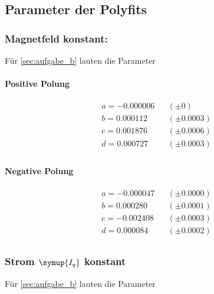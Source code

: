 

\subsection{Parameter der Polyfits}
\label{sec:messwert}


\subsubsection{Magnetfeld konstant:} %
Für \ref{sec:aufgabe_b} lauten die Parameter

\vspace{1cm}
\begin{minipage}{0.49\textwidth}
\centering
\paragraph{Positive Polung}
\begin{align*}
  &a = -0.000006 &&(\pm 0) \\
  &b = 0.000112 &&(\pm 0.0003)\\
  &c = 0.001876 &&(\pm 0.0006) \\
  &d = 0.000727 &&(\pm 0.0003) \\
\end{align*}
\end{minipage}
\hfill
\begin{minipage}{0.49\textwidth}
\centering
\paragraph{Negative Polung}
\begin{align*}
   &a = -0.000047 &&(\pm 0.0000) \\
   &b = 0.000280 &&(\pm 0.0001 ) \\
   &c = -0.002408 &&(\pm 0.0003) \\
   &d = 0.000084 &&(\pm 0.0002 ) \\
\end{align*}
\end{minipage}

\subsubsection{Strom $\symup{I_q}$ konstant}
Für \ref{sec:aufgabe_b} lauten die Parameter
\vspace{1cm}

